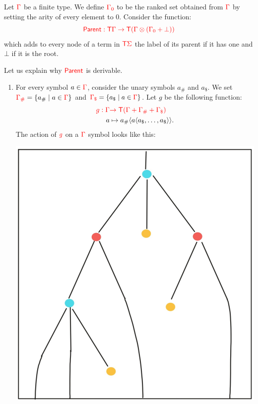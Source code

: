 \bigskip
\noindent \begin{example}\label{ex:patternMatching} 
\end{example}


\bigskip
\noindent \begin{example}  Let ${\color{red}{\Gamma}}$ be a finite type. We define ${\color{red}{{\color{red}{\Gamma}}_0}}$  to be the ranked set obtained from ${\color{red}{\Gamma}}$ by setting the arity of every element to $0$.  
\medskip
Consider the function:
$${\color{red}{ \mathsf{Parent}: {\color{red}{\mathsf T}}{\color{red}{\Gamma}}\to {\color{red}{\mathsf T}}({\color{red}{\Gamma}}\otimes ({\color{red}{\Gamma}}_0+\bot))}}$$
which adds to every node of a term in ${\color{red}{\mathsf T}} {\color{red}{\Sigma}}$ the label  of its parent if it has one and $\bot$ if it is the root.

Let us explain why ${\color{red}{\mathsf{Parent}}}$ is derivable. 
\begin{enumerate}
\item For every symbol $a\in {\color{red}{\Gamma}}$, consider the unary symbols $a_\#$ and $a_\$$.
We set ${\color{red}{{\color{red}{\Gamma}}_\#}}=\{a_\#\mid a\in{\color{red}{\Gamma}}\}$ and ${\color{red}{{\color{red}{\Gamma}}_\$}}=\{a_\$\mid a\in{\color{red}{\Gamma}}\}$.
Let $g$ be the following function:
 \begin{align*}
{\color{red}{  g: {\color{red}{\Gamma}}}} &{\color{red}{\to {\color{red}{\mathsf T}}({\color{red}{\Gamma}}+{\color{red}{\Gamma}}_\#+{\color{red}{\Gamma}}_\$)}}\\
  a &\mapsto a_\#\langle{a\langle{a_\$,\dots,a_\$}\rangle}\rangle.
\end{align*}
The action of ${\color{red}{g}}$ on a ${\color{red}{\Gamma}}$ symbol looks like this:
\begin{center}
\includegraphics[scale=.15]{MyPic1.jpg}

\end{center}
\end{enumerate}
\end{example}
